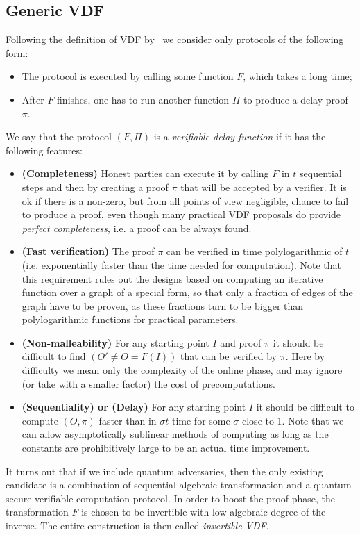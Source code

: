 \documentclass{article}
\begin{document}
\subsection{Generic VDF}\label{sec:genvdf}

Following the definition of VDF by~\cite{DBLP:conf/crypto/BonehBBF18} we consider only protocols of the following form:
\begin{itemize}
    \item The protocol is executed by calling some function $F$, which takes a long time;
    \item After $F$ finishes, one has to run another function $\Pi$ to produce a delay proof $\pi$.
\end{itemize}
We say that the protocol $(F,\Pi)$ is a \emph{verifiable delay function}  if it has the following features:
\begin{itemize}
    \item \textbf{(Completeness)} Honest parties can execute it by calling $F$ in $t$ sequential steps and then by creating a proof $\pi$ that will be accepted by a verifier. It is ok if there is a non-zero, but from all points of view negligible, chance to fail to produce a proof, even though many practical VDF proposals do provide \emph{perfect completeness}, i.e. a proof can be always found.
    \item \textbf{(Fast verification)} The proof $\pi$ can be verified in time polylogarithmic of $t$  (i.e. exponentially faster than the time needed for computation).  Note that this requirement rules out the designs based on computing an iterative function over a graph of a \href{https://cs.brown.edu/research/pubs/theses/ugrad/2019/zhang.aaron.pdf}{special form}, so that only a fraction of edges of the graph have to be proven, as these fractions turn to be bigger than polylogarithmic functions for practical parameters.
    \item \textbf{(Non-malleability)} For any starting point $I$ and proof $\pi$ it should be difficult to find $(O'\neq O=F(I))$ that can be verified by $\pi$. Here by difficulty we mean only the complexity of the online phase, and may ignore (or take with a smaller factor) the cost of  precomputations.
    \item \textbf{(Sequentiality) or (Delay)} For any starting point $I$ it should be difficult to compute $(O,\pi)$ faster than in $\sigma t $ time for some  $\sigma $ close to 1. Note that we can allow asymptotically sublinear methods of computing as long as the constants are prohibitively large to be an actual time improvement.
\end{itemize}
It turns out that if we include quantum adversaries, then the only existing candidate is a combination of sequential algebraic transformation and a quantum-secure verifiable computation protocol. In order to boost the proof phase, the transformation $F$ is chosen to be invertible with low algebraic degree of the inverse. The entire construction is then called  \emph{invertible  VDF}.  
\end{document}
